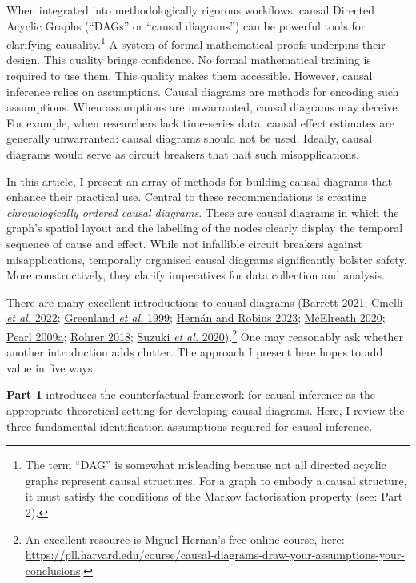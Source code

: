 \documentclass[
  singlecolumn]{article}
\begin{document}
When integrated into methodologically rigorous workflows, causal
Directed Acyclic Graphs (``DAGs'' or ``causal diagrams'') can be
powerful tools for clarifying causality.\footnote{The term ``DAG'' is
  somewhat misleading because not all directed acyclic graphs represent
  causal structures. For a graph to embody a causal structure, it must
  satisfy the conditions of the Markov factorisation property (see: Part
  2).} A system of formal mathematical proofs underpins their design.
This quality brings confidence. No formal mathematical training is
required to use them. This quality makes them accessible. However,
causal inference relies on assumptions. Causal diagrams are methods for
encoding such assumptions. When assumptions are unwarranted, causal
diagrams may deceive. For example, when researchers lack time-series
data, causal effect estimates are generally unwarranted: causal diagrams
should not be used. Ideally, causal diagrams would serve as circuit
breakers that halt such misapplications.

In this article, I present an array of methods for building causal
diagrams that enhance their practical use. Central to these
recommendations is creating \emph{chronologically ordered causal
diagrams}. These are causal diagrams in which the graph's spatial layout
and the labelling of the nodes clearly display the temporal sequence of
cause and effect. While not infallible circuit breakers against
misapplications, temporally organised causal diagrams significantly
bolster safety. More constructively, they clarify imperatives for data
collection and analysis.

There are many excellent introductions to causal diagrams
(\protect\hyperlink{ref-barrett2021}{Barrett 2021};
\protect\hyperlink{ref-cinelli2022}{Cinelli \emph{et al.} 2022};
\protect\hyperlink{ref-greenland1999}{Greenland \emph{et al.} 1999};
\protect\hyperlink{ref-hernuxe1n2023}{Hernán and Robins 2023};
\protect\hyperlink{ref-mcelreath2020}{McElreath 2020};
\protect\hyperlink{ref-pearl2009}{Pearl 2009a};
\protect\hyperlink{ref-rohrer2018}{Rohrer 2018};
\protect\hyperlink{ref-suzuki2020}{Suzuki \emph{et al.}
2020}).\footnote{An excellent resource is Miguel Hernan's free online
  course, here:
  \url{https://pll.harvard.edu/course/causal-diagrams-draw-your-assumptions-your-conclusions}.}
One may reasonably ask whether another introduction adds clutter. The
approach I present here hopes to add value in five ways.

\textbf{Part 1} introduces the counterfactual framework for causal
inference as the appropriate theoretical setting for developing causal
diagrams. Here, I review the three fundamental identification
assumptions required for causal inference.
\end{document}
